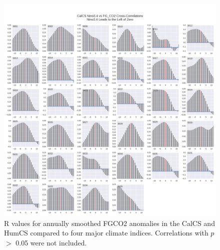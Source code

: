 \documentclass[12pt]{article}
\begin{document}
\begin{figure}[!h]
	\centering
	\includegraphics[width=\linewidth]{../../figs/calcs/cross-correlation/Nino34_FGCO2_cross-correlation_CalCS.png}
	\caption{R values for annually smoothed FGCO2 anomalies in the CalCS and HumCS compared to four major climate indices. Correlations with $p$ $>$ 0.05 were not included.}
	\label{fig:CalCS-ENSO-Cross}
\end{figure}

\clearpage

\end{document}
